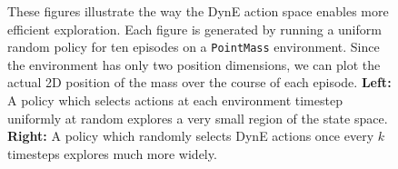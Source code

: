 \begin{subappendices}
\begin{figure}[h]
\begin{subfigure}[t]{0.45\textwidth}
\end{subfigure}
\label{fig:exploration}
\caption{These figures illustrate the way the DynE action space enables more efficient exploration. Each figure is generated by running a uniform random policy for ten episodes on a \texttt{PointMass} environment. Since the environment has only two position dimensions, we can plot the actual 2D position of the mass over the course of each episode. \textbf{Left:} A policy which selects actions at each environment timestep uniformly at random explores a very small region of the state space. \textbf{Right:} A policy which randomly selects DynE actions once every $k$ timesteps explores much more widely.}
\end{figure}
\end{subappendices}


\printendnotes